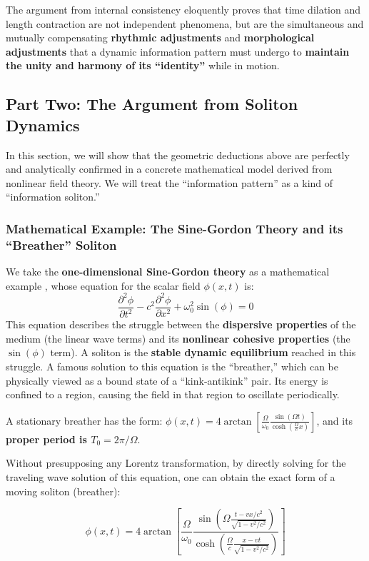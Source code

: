 \documentclass[11pt, a4paper]{article}
\begin{document}
The argument from internal consistency eloquently proves that time dilation and length contraction are not independent phenomena, but are the simultaneous and mutually compensating \textbf{rhythmic adjustments} and \textbf{morphological adjustments} that a dynamic information pattern must undergo to \textbf{maintain the unity and harmony of its ``identity''} while in motion.

\subsection*{Part Two: The Argument from Soliton Dynamics}

In this section, we will show that the geometric deductions above are perfectly and analytically confirmed in a concrete mathematical model derived from nonlinear field theory. We will treat the ``information pattern'' as a kind of ``information soliton.''

\subsubsection{Mathematical Example: The Sine-Gordon Theory and its ``Breather'' Soliton}

We take the \textbf{one-dimensional Sine-Gordon theory} as a mathematical example \cite{DrazinJohnson1989}, whose equation for the scalar field $\phi(x,t)$ is:
\[
\frac{\partial^2\phi}{\partial t^2} - c^2\frac{\partial^2\phi}{\partial x^2} + \omega_0^2\sin(\phi) = 0
\]
This equation describes the struggle between the \textbf{dispersive properties} of the medium (the linear wave terms) and its \textbf{nonlinear cohesive properties} (the $\sin(\phi)$ term). A soliton is the \textbf{stable dynamic equilibrium} reached in this struggle. A famous solution to this equation is the ``breather,'' which can be physically viewed as a bound state of a ``kink-antikink'' pair. Its energy is confined to a region, causing the field in that region to oscillate periodically.

A stationary breather has the form: $\phi(x,t) = 4 \arctan\left[ \frac{\Omega}{\omega_0} \frac{\sin(\Omega t)}{\cosh\left(\frac{\Omega}{c}x\right)} \right]$, and its \textbf{proper period is $T_0 = 2\pi / \Omega$}.

Without presupposing any Lorentz transformation, by directly solving for the traveling wave solution of this equation, one can obtain the exact form of a moving soliton (breather):

\[
\phi(x,t) = 4 \arctan\left[ \frac{\Omega}{\omega_0} \frac{\sin\left( \Omega \frac{t - vx/c^2}{\sqrt{1 - v^2/c^2}} \right)}{\cosh\left( \frac{\Omega}{c} \frac{x - vt}{\sqrt{1 - v^2/c^2}} \right)} \right]
\]
\end{document}
